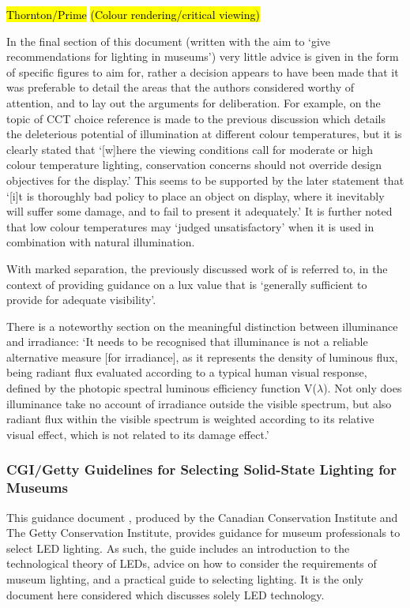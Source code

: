 \hl{Thornton/Prime}
\hl{(Colour rendering/critical viewing)}

In the final section of this document (written with the aim to `give recommendations for lighting in museums') very little advice is given in the form of specific figures to aim for, rather a decision appears to have been made that it was preferable to detail the areas that the authors considered worthy of attention, and to lay out the arguments for deliberation. For example, on the topic of \gls{CCT} choice reference is made to the previous discussion which details the deleterious potential of illumination at different colour temperatures, but it is clearly stated that `[w]here the viewing conditions call for moderate or high colour temperature lighting, conservation concerns should not override design objectives for the display.' This seems to be supported by the later statement that `[i]t is thoroughly bad policy to place an object on display, where it inevitably will suffer some damage, and to fail to present it adequately.' It is further noted that low colour temperatures may `judged unsatisfactory' when it is used in combination with natural illumination. 

With marked separation, the previously discussed work of \citet{loe_preferred_1982} is referred to, in the context of providing guidance on a lux value that is `generally sufficient to provide for adequate visibility'.

There is a noteworthy section on the meaningful distinction between illuminance and irradiance: `It needs to be recognised that illuminance is not a reliable alternative measure [for irradiance], as it represents the density of luminous flux, being radiant flux evaluated according to a typical human visual response, defined by the photopic spectral luminous efficiency function V($\lambda$). Not only does illuminance take no account of irradiance outside the visible spectrum, but also radiant flux within the visible spectrum is weighted according to its relative visual effect, which is not related to its damage effect.'

\subsubsection{CGI/Getty Guidelines for Selecting Solid-State Lighting for Museums}

This guidance document \citep{druzik_guidelines_2012}, produced by the Canadian Conservation Institute and The Getty Conservation Institute, provides guidance for museum professionals to select \gls{LED} lighting. As such, the guide includes an introduction to the technological theory of \glspl{LED}, advice on how to consider the requirements of museum lighting, and a practical guide to selecting lighting. It is the only document here considered which discusses solely LED technology.

